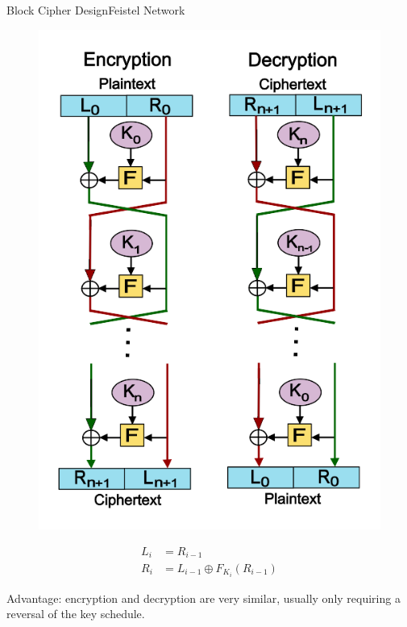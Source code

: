 \documentclass[12pt]{beamer}
\begin{document}
\begin{frame}{Block Cipher Design}{Feistel Network}
	\centering
	\begin{minipage}{0.45\textwidth}
		\begin{figure}[h!]
			\centering
			\includegraphics[width=\textwidth,height=0.8\textheight,keepaspectratio]{pictures/feistel-structure}
		\end{figure}
	\end{minipage}
	\begin{minipage}{0.45\textwidth}
		\begin{align*}
			L_i &= R_{i-1} \\
			R_i &= L_{i-1} \oplus F_{K_i}(R_{i-1})
		\end{align*}

		Advantage: encryption and decryption are very similar,
		usually only requiring a reversal of the key schedule.
	\end{minipage}

\end{frame}
\end{document}
